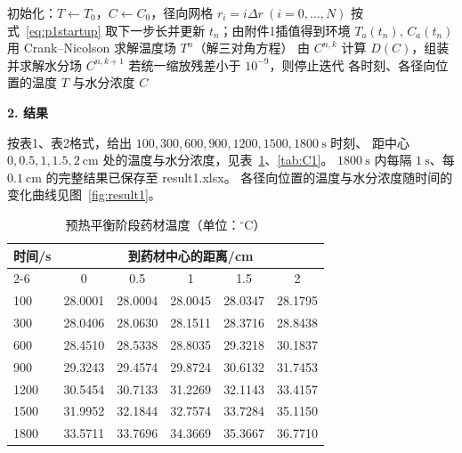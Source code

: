 \documentclass[12pt,a4paper]{ctexart}
\begin{document}
\begin{algorithm}[H]
\caption{问题一瞬态传热--传质数值求解}
\label{alg:p1}
\begin{algorithmic}[1]
\State 初始化：$T\gets T_0$，$C\gets C_0$，径向网格 $r_i=i\Delta r\ (i=0,\dots,N)$
    \State 按式~\eqref{eq:p1startup} 取下一步长并更新 $t_n$；由附件1插值得到环境 $T_a(t_n),\,C_a(t_n)$
    \State 用 Crank--Nicolson 求解温度场 $T^{n}$（解三对角方程）
     
        \State 由 $C^{n,k}$ 计算 $D(C)$，组装并求解水分场 $C^{n,k+1}$
        \State 若统一缩放残差小于 $10^{-9}$，则停止迭代
    \EndFor
\EndFor
\State \Return 各时刻、各径向位置的温度 $T$ 与水分浓度 $C$
\end{algorithmic}
\end{algorithm}

\textbf{2. 结果}

按表1、表2格式，给出 $100,300,600,900,1200,1500,1800\ \mathrm{s}$ 时刻、
距中心 $0,0.5,1,1.5,2\ \mathrm{cm}$ 处的温度与水分浓度，见表~\ref{tab:T1}、\ref{tab:C1}。
$1800\ \mathrm{s}$ 内每隔 $1\ \mathrm{s}$、每 $0.1\ \mathrm{cm}$ 的完整结果已保存至 result1.xlsx。
各径向位置的温度与水分浓度随时间的变化曲线见图~\ref{fig:result1}。

\begin{table}[H]
\centering
\begin{tabular}{lccccc}
\toprule
\multirow{2}{*}{时间/s} & \multicolumn{5}{c}{到药材中心的距离/cm} \\
\cmidrule(lr){2-6}
 & 0 & 0.5 & 1 & 1.5 & 2 \\
\midrule
100 & 28.0001 & 28.0004 & 28.0045 & 28.0347 & 28.1795 \\
300 & 28.0406 & 28.0630 & 28.1511 & 28.3716 & 28.8438 \\
600 & 28.4510 & 28.5338 & 28.8035 & 29.3218 & 30.1837 \\
900 & 29.3243 & 29.4574 & 29.8724 & 30.6132 & 31.7453 \\
1200 & 30.5454 & 30.7133 & 31.2269 & 32.1143 & 33.4157 \\
1500 & 31.9952 & 32.1844 & 32.7574 & 33.7284 & 35.1150 \\
1800 & 33.5711 & 33.7696 & 34.3669 & 35.3667 & 36.7710 \\
\bottomrule
\end{tabular}
\caption{预热平衡阶段药材温度（单位：$^\circ$C）}
\label{tab:T1}
\end{table}
\end{document}
